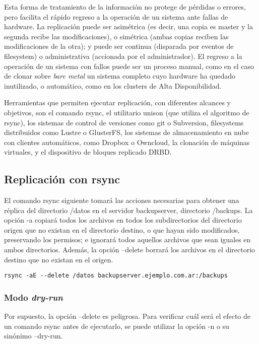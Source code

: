 Esta forma de tratamiento de la información no protege de pérdidas o errores, pero facilita el rápido regreso a la operación de un sistema ante fallas de hardware. La replicación puede ser asimétrica (es decir, una copia es master y la segunda recibe las modificaciones), o simétrica (ambas copias reciben las modificaciones de la otra); y puede ser continua (disparada por eventos de filesystem) o administrativa (accionada por el administrador). El regreso a la operación de un sistema con fallos puede ser un proceso manual, como en el caso de clonar sobre \emph{bare metal} un sistema completo cuyo hardware ha quedado inutilizado, o automático, como en los clusters de Alta Disponibilidad.

Herramientas que permiten ejecutar replicación, con diferentes alcances y objetivos, son el comando rsync, el utilitario unison (que utiliza el algoritmo de rsync), los sistemas de control de versiones como git o Subversion, filesystems distribuidos como Lustre o GlusterFS, los sistemas de almacenamiento en nube con clientes automáticos, como Dropbox o Owncloud, la clonación de máquinas virtuales, y el dispositivo de bloques replicado DRBD. 

\subsection{Replicación con rsync}

El comando rsync siguiente tomará las acciones necesarias para obtener una réplica del directorio /datos en el servidor backupserver, directorio /backups. La opción -a copiará todos los archivos en todos los subdirectorios del directorio origen que no existan en el directorio destino, o que hayan sido modificados, preservando los permisos; e ignorará todos aquellos archivos que sean iguales en ambos directorios. Además, la opción --delete borrará los archivos en el directorio destino que no existan en el origen. 

\begin{lstlisting}
rsync -aE --delete /datos backupserver.ejemplo.com.ar:/backups
\end{lstlisting}

\subsubsection{Modo \emph{dry-run}}

Por supuesto, la opción –delete es peligrosa. Para verificar cuál será el efecto de un comando rsync antes de ejecutarlo, se puede utilizar la opción -n o su sinónimo –dry-run.

